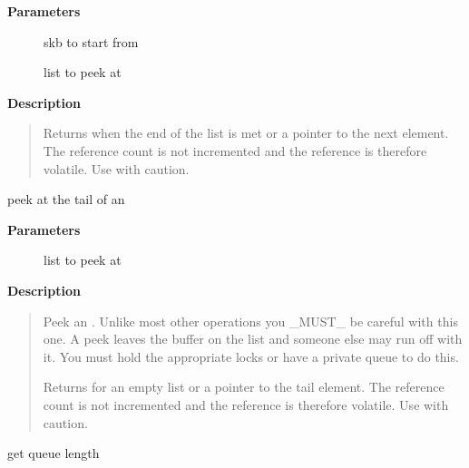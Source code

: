 \documentclass[a4paper,8pt,english]{sphinxmanual}
\begin{document}
\textbf{Parameters}
\begin{description}
\item[{}] \leavevmode
skb to start from

\item[{}] \leavevmode
list to peek at

\end{description}

\textbf{Description}
\begin{quote}

Returns  when the end of the list is met or a pointer to the
next element. The reference count is not incremented and the
reference is therefore volatile. Use with caution.
\end{quote}

\begin{fulllineitems}
\label{networking/kapi:c.skb_peek_tail}
peek at the tail of an 

\end{fulllineitems}


\textbf{Parameters}
\begin{description}
\item[{}] \leavevmode
list to peek at

\end{description}

\textbf{Description}
\begin{quote}

Peek an {\hyperref[networking/kapi:c.sk_buff]{\emph{}}}. Unlike most other operations you \_MUST\_
be careful with this one. A peek leaves the buffer on the
list and someone else may run off with it. You must hold
the appropriate locks or have a private queue to do this.

Returns  for an empty list or a pointer to the tail element.
The reference count is not incremented and the reference is therefore
volatile. Use with caution.
\end{quote}

\begin{fulllineitems}
\label{networking/kapi:c.skb_queue_len}
get queue length

\end{fulllineitems}
\end{document}
